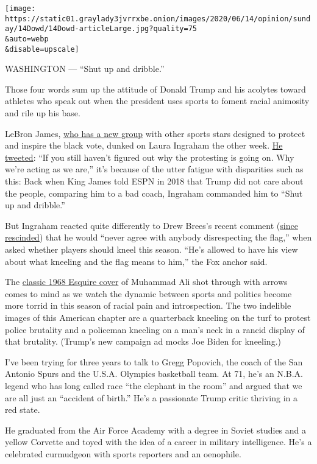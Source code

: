 \texttt{[image: https://static01.graylady3jvrrxbe.onion/images/2020/06/14/opinion/sunday/14Dowd/14Dowd-articleLarge.jpg?quality=75\\\&auto=webp\\\&disable=upscale]}

WASHINGTON --- ``Shut up and dribble.''

Those four words sum up the attitude of Donald Trump and his acolytes
toward athletes who speak out when the president uses sports to foment
racial animosity and rile up his base.

LeBron James,
\href{https://www.nytimes3xbfgragh.onion/2020/06/10/us/politics/lebron-james-voting-rights.html}{who
has a new group} with other sports stars designed to protect and inspire
the black vote, dunked on Laura Ingraham the other week.
\href{https://twitter.com/KingJames/status/1268616817544531969}{He
tweeted}: ``If you still haven't figured out why the protesting is going
on. Why we're acting as we are,'' it's because of the utter fatigue with
disparities such as this: Back when King James told ESPN in 2018 that
Trump did not care about the people, comparing him to a bad coach,
Ingraham commanded him to ``Shut up and dribble.''

But Ingraham reacted quite differently to Drew Brees's recent comment
(\href{https://www.instagram.com/p/CBE4y_9Hj2S/}{since rescinded}) that
he would ``never agree with anybody disrespecting the flag,'' when asked
whether players should kneel this season. ``He's allowed to have his
view about what kneeling and the flag means to him,'' the Fox anchor
said.

The
\href{https://classic.esquire.com/article/1968/4/1/muhammad-ali}{classic
1968 Esquire cover} of Muhammad Ali shot through with arrows comes to
mind as we watch the dynamic between sports and politics become more
torrid in this season of racial pain and introspection. The two
indelible images of this American chapter are a quarterback kneeling on
the turf to protest police brutality and a policeman kneeling on a man's
neck in a rancid display of that brutality. (Trump's new campaign ad
mocks Joe Biden for kneeling.)

I've been trying for three years to talk to Gregg Popovich, the coach of
the San Antonio Spurs and the U.S.A. Olympics basketball team. At 71,
he's an N.B.A. legend who has long called race ``the elephant in the
room'' and argued that we are all just an ``accident of birth.'' He's a
passionate Trump critic thriving in a red state.

He graduated from the Air Force Academy with a degree in Soviet studies
and a yellow Corvette and toyed with the idea of a career in military
intelligence. He's a celebrated curmudgeon with sports reporters and an
oenophile.

